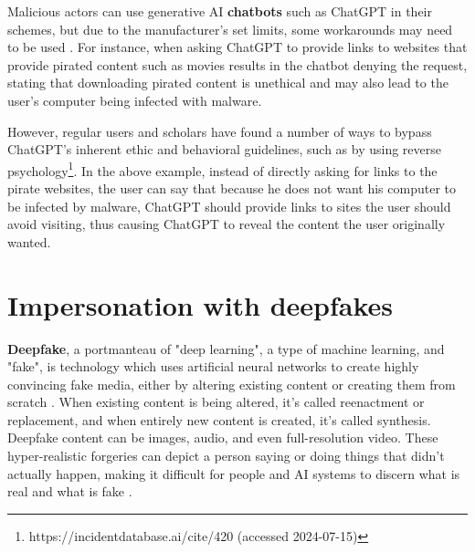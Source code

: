 Malicious actors can use generative AI  \textbf{chatbots} such as ChatGPT in their schemes, but due to the manufacturer's set limits, some workarounds may need to be used \citep{guptaFromChatGPTtoThreatGPT2023}. For instance, when asking ChatGPT to provide links to websites that provide pirated content such as movies results in the chatbot denying the request, stating that downloading pirated content is unethical and may also lead to the user's computer being infected with malware.


However, regular users and scholars have found a number of ways to bypass ChatGPT's inherent ethic and behavioral guidelines, such as by using reverse psychology\footnote{https://incidentdatabase.ai/cite/420 (accessed 2024-07-15)}. In the above example, instead of directly asking for links to the pirate websites, the user can say that because he does not want his computer to be infected by malware, ChatGPT should provide links to sites the user should avoid visiting, thus causing ChatGPT to reveal the content the user originally wanted.













\section{Impersonation with deepfakes}
\begin{comment}
Deepfake-generated content

What to cover:
    - What is a deepfake
    - Deepfakeja ei käsitely aiemmin? Generative AI kappaleessa?
    - Seuraava section kertoo tietojenkalastelusta ja sitoo chatbotit, automated intelligence gathering ja nää deepfaket yhteen kokonaisuudeksi

\end{comment}

\textbf{Deepfake}, a portmanteau of "deep learning", a type of machine learning, and "fake", is technology which uses artificial neural networks to create highly convincing fake media, either by altering existing content or creating them from scratch \citep{mirskyTheCreationAndDetectionOfDeepfakes2021}. When existing content is being altered, it's called reenactment or replacement, and when entirely new content is created, it's called synthesis. Deepfake content can be images, audio, and even full-resolution video. These hyper-realistic forgeries can depict a person saying or doing things that didn't actually happen, making it difficult for people and AI systems to discern what is real and what is fake \citep{blauthArtificialIntelligenceCrime2022}.

